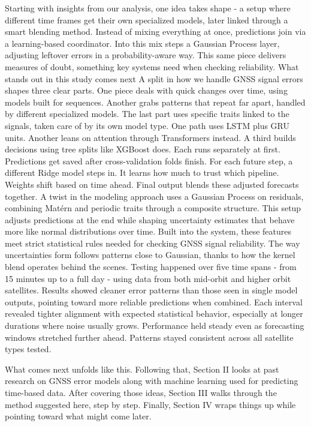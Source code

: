 \documentclass[conference]{IEEEtran}
\begin{document}
Starting with insights from our analysis, one idea takes shape - a setup where different time frames get their own specialized models, later linked through a smart blending method. Instead of mixing everything at once, predictions join via a learning-based coordinator. Into this mix steps a Gaussian Process layer, adjusting leftover errors in a probability-aware way. This same piece delivers measures of doubt, something key systems need when checking reliability. What stands out in this study comes next
A split in how we handle GNSS signal errors shapes three clear parts. One piece deals with quick changes over time, using models built for sequences. Another grabs patterns that repeat far apart, handled by different specialized models. The last part uses specific traits linked to the signals, taken care of by its own model type.
One path uses LSTM plus GRU units. Another leans on attention through Transformers instead. A third builds decisions using tree splits like XGBoost does. Each runs separately at first. Predictions get saved after cross-validation folds finish. For each future step, a different Ridge model steps in. It learns how much to trust which pipeline. Weights shift based on time ahead. Final output blends these adjusted forecasts together.
A twist in the modeling approach uses a Gaussian Process on residuals, combining Matérn and periodic traits through a composite structure. This setup adjusts predictions at the end while shaping uncertainty estimates that behave more like normal distributions over time. Built into the system, these features meet strict statistical rules needed for checking GNSS signal reliability. The way uncertainties form follows patterns close to Gaussian, thanks to how the kernel blend operates behind the scenes.
Testing happened over five time spans - from 15 minutes up to a full day - using data from both mid-orbit and higher orbit satellites. Results showed cleaner error patterns than those seen in single model outputs, pointing toward more reliable predictions when combined. Each interval revealed tighter alignment with expected statistical behavior, especially at longer durations where noise usually grows. Performance held steady even as forecasting windows stretched further ahead. Patterns stayed consistent across all satellite types tested.

What comes next unfolds like this. Following that, Section II looks at past research on GNSS error models along with machine learning used for predicting time-based data. After covering those ideas, Section III walks through the method suggested here, step by step. Finally, Section IV wraps things up while pointing toward what might come later.
 
\end{document}
